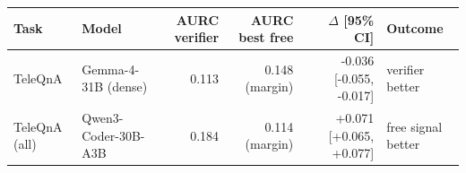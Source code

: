 \begin{tabular}{llrrrl}
\toprule
Task & Model & AURC verifier & AURC best free & $\Delta$ [95\% CI] & Outcome \\
\midrule
TeleQnA & Gemma-4-31B (dense) & 0.113 & 0.148 (margin) & -0.036 [-0.055, -0.017] & verifier better \\
TeleQnA (all) & Qwen3-Coder-30B-A3B & 0.184 & 0.114 (margin) & +0.071 [+0.065, +0.077] & free signal better \\
\bottomrule
\end{tabular}
